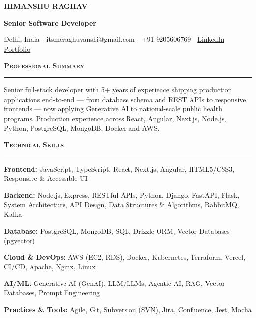\documentclass[10pt,letterpaper]{article}
\newcommand{\resumesection}[1]{%
  \vspace{4pt}%
  {\fontsize{10.5}{12}\selectfont\bfseries\scshape #1}\par
  \vspace{-5pt}%
  \noindent\rule{\linewidth}{0.9pt}\par
  \vspace{1.5pt}%
}
\newcommand{\skillrow}[2]{%
  \noindent\textbf{#1:} #2\par
  \vspace{1pt}%
}
\begin{document}
\begin{center}
  {\fontsize{20}{22}\selectfont\bfseries HIMANSHU RAGHAV}\par
  \vspace{2pt}
  {\fontsize{11}{13}\selectfont\bfseries Senior Software Developer}\par
  \vspace{4pt}
  {\fontsize{9}{11}\selectfont
    Delhi, India \,\textbullet\, itsmeraghuvanshi@gmail.com \,\textbullet\, +91 9205606769 \,\textbullet\,
    \href{https://www.linkedin.com/in/im-raghav/}{LinkedIn} \,\textbullet\,
    \href{https://im-raghav.github.io/portfolio/}{Portfolio}\par
  }
\end{center}

\resumesection{Professional Summary}
{\fontsize{10.1}{13}\selectfont\justifying
Senior full-stack developer with 5+ years of experience shipping production applications end-to-end
--- from database schema and REST APIs to responsive frontends --- now applying Generative AI to
national-scale public health programs. Production experience across React, Angular, Next.js, Node.js,
Python, PostgreSQL, MongoDB, Docker and AWS.\par}

\resumesection{Technical Skills}
{\fontsize{10.1}{13}\selectfont
\skillrow{Frontend}{JavaScript, TypeScript, React, Next.js, Angular, HTML5/CSS3, Responsive \& Accessible UI}
\skillrow{Backend}{Node.js, Express, RESTful APIs, Python, Django, FastAPI, Flask, System Architecture, API Design, Data Structures \& Algorithms, RabbitMQ, Kafka}
\skillrow{Database}{PostgreSQL, MongoDB, SQL, Drizzle ORM, Vector Databases (pgvector)}
\skillrow{Cloud \& DevOps}{AWS (EC2, RDS), Docker, Kubernetes, Terraform, Vercel, CI/CD, Apache, Nginx, Linux}
\skillrow{AI/ML}{Generative AI (GenAI), LLM/LLMs, Agentic AI, RAG, Vector Databases, Prompt Engineering}
\skillrow{Practices \& Tools}{Agile, Git, Subversion (SVN), Jira, Confluence, Jest, Mocha}
}
\end{document}
